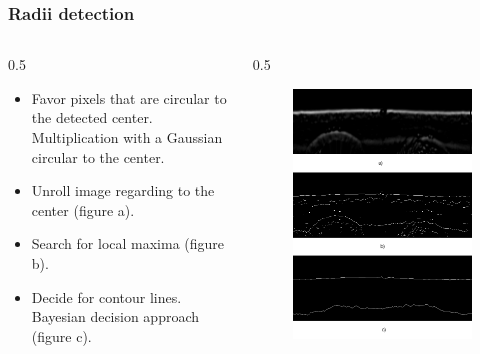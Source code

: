 \documentclass{beamer}
\begin{document}
\begin{frame}
	[fragile] \frametitle{Radii detection} 
	\begin{columns}
		\begin{column}
			{0.5
			\textwidth} 
			\begin{itemize}
				\item Favor pixels that are circular to the detected center. Multiplication with a Gaussian circular to the center. 
				\item Unroll image regarding to the center (figure a). 
				\item Search for local maxima (figure b). 
				\item Decide for contour lines. Bayesian decision approach (figure c). 
			\end{itemize}
		\end{column}
		\begin{column}
			{0.5
			\textwidth} 
			\begin{figure}
				[ht] \centering 
				\includegraphics[width=0.89
				\textwidth]{../report/iris/unrolled.png} \label{fig:hough_impl} 
			\end{figure}
		\end{column}
	\end{columns}
\end{frame}
\end{document}
